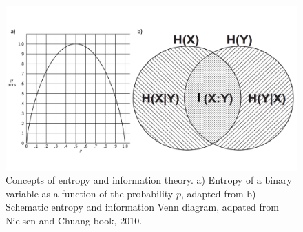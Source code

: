 \begin{figure}
    \centering
    \includegraphics[width=\textwidth]{Figures/Chapter1/intro_fig_info.pdf}
    \caption{Concepts of entropy and information theory. a) Entropy of a binary variable as a function of the probability $p$, adapted from \cite{shannon1948} b) Schematic entropy and information Venn diagram, adpated from Nielsen and Chuang book, 2010.}
    \label{fig:chap1:info_theory_concepts}
\end{figure}

